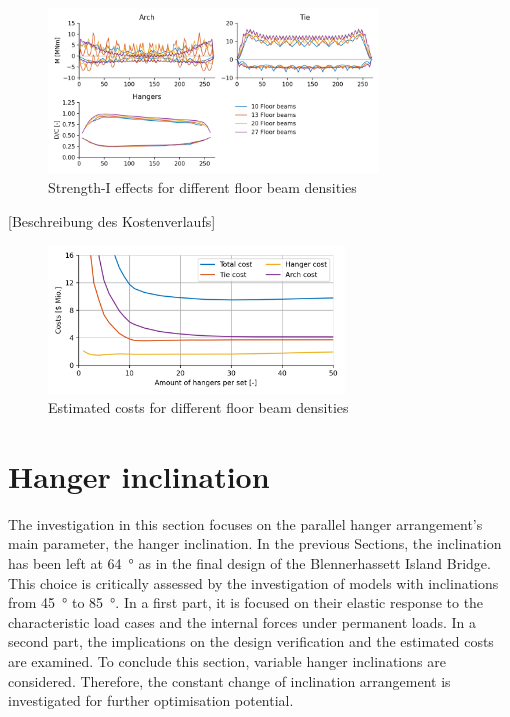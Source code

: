 \begin{figure}[H]
    \centering
    \includegraphics[trim={0 0.4cm 0 0.4cm},clip, width=0.78\textwidth]{calculations/floor beam comparison/strength-I.png}
    \caption{Strength-I effects for different floor beam densities}
    \label{fig:fb_strength}
\end{figure}

[Beschreibung des Kostenverlaufs]

\begin{figure}[H]
    \centering
    \includegraphics[width=0.7\textwidth]{calculations/floor beam comparison/cost comparison.png}
    \caption{Estimated costs for different floor beam densities}
    \label{fig:fb_costs}
\end{figure}


\newpage
\section{Hanger inclination}
The investigation in this section focuses on the parallel hanger arrangement's main parameter, the hanger inclination. In the previous Sections, the inclination has been left at \SI{64}{\degree} as in the final design of the Blennerhassett Island Bridge. This choice is critically assessed by the investigation of models with inclinations from \SI{45}{\degree} to \SI{85}{\degree}. In a first part, it is focused on their elastic response to the characteristic load cases and the internal forces under permanent loads.  In a second part, the implications on the design verification and the estimated costs are examined. To conclude this section, variable hanger inclinations are considered. Therefore, the constant change of inclination arrangement is investigated for further optimisation potential.


